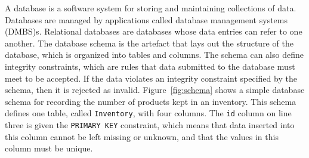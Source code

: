 

A database is a software system for storing and maintaining collections of data. Databases
are managed by applications called database management systems (DMBS)s. Relational databases are
databases whose data entries can refer to one another. The database schema is the artefact that
lays out the structure of the database, which is organized into tables and columns. The schema can also
define integrity constraints, which are rules that data submitted to the database must meet to be
accepted. If the data violates an integrity constraint specified by the schema, then it is rejected as
invalid. Figure~\ref{fig:schema} shows a simple database schema for recording the number of products
kept in an inventory. This schema defines one table, called \texttt{Inventory}, with four columns.
The \texttt{id} column on line three is given the \texttt{PRIMARY KEY} constraint, which means that
data inserted into this column cannot be left missing or unknown, and that the values in this column
must be unique.
